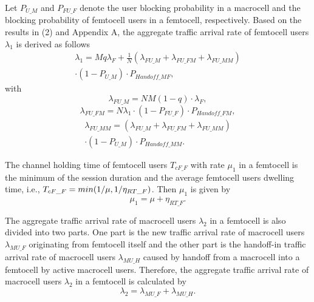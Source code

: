\documentclass[10pt,final,journal,letterpaper,twoside,twocolumn]{IEEEtran}
\begin{document}
Let ${P_{U\_M}}$ and ${P_{FU\_F}}$ denote the user blocking probability in a
macrocell and the blocking probability of femtocell users in a femtocell,
respectively. Based on the results in (2) and Appendix A, the aggregate traffic arrival rate of femtocell users ${\lambda _1}$ is derived as follows
\begin{equation}
\begin{split}
{\lambda _1} = Mq{\lambda _F} + \frac{1}{N}\left( {{\lambda _{FU\_M}} + {\lambda _{FU\_FM}} + {\lambda _{FU\_MM}}}\right)\\
\cdot \left( {1 - {P_{U\_M}}} \right) \cdot {P_{Handoff\_MF}},
\end{split}
\label{eq3}
\tag{3a}
\end{equation}
with
\begin{equation}
{\lambda _{FU\_M}} = NM\left( {1 - q} \right) \cdot {\lambda _F},
\label{eq4}
\tag{3b}
\end{equation}
\begin{equation}
{\lambda _{FU\_FM}} = N{\lambda _1} \cdot \left( {1 - {P_{FU\_F}}} \right) \cdot {P_{Handoff\_FM}},
\label{eq5}
\tag{3c}
\end{equation}
\begin{equation}
\begin{split}
{\lambda _{FU\_MM}} = \left( {{\lambda _{FU\_M}} + {\lambda _{FU\_FM}} + {\lambda _{FU\_MM}}} \right) \\
\cdot \left( {1 - {P_{U\_M}}} \right) \cdot {P_{Handoff\_MM}}.
\end{split}
\label{eq6}
\tag{3d}
\end{equation}


The channel holding time of femtocell users ${T_{cF\_F}}$ with rate ${\mu _1}$ in a femtocell is the minimum of the session duration and the average femtocell users dwelling time, i.e., ${T_{cF\_F}} = min({1 \mathord{\left/{\vphantom {1 \mu }} \right. \kern-\nulldelimiterspace} \mu },{1 \mathord{\left/ {\vphantom {1 {{\eta _{RT\_F}}}}} \right.\kern-\nulldelimiterspace} {{\eta _{RT\_F}}}})$. Then ${\mu _1}$ is given by \cite{Shun05}
\begin{equation}
{\mu _1} = \mu  + {\eta _{RT\_F}}.
\label{eq7}
\tag{4}
\end{equation}

The aggregate traffic arrival rate of macrocell users ${\lambda _2}$ in a femtocell is also divided into two parts. One part is the new traffic arrival rate of macrocell users ${\lambda _{MU\_F}}$ originating from femtocell itself and the other part is the handoff-in traffic arrival rate of macrocell users ${\lambda
_{MU\_H}}$ caused by handoff from a macrocell into a femtocell by active
macrocell users. Therefore, the aggregate traffic arrival rate of macrocell users ${\lambda _2}$ in a
femtocell is calculated by
\begin{equation}
{\lambda _2} = {\lambda _{MU\_F}} + {\lambda _{MU\_H}}.
\label{eq8}
\tag{5}
\end{equation}
\end{document}
